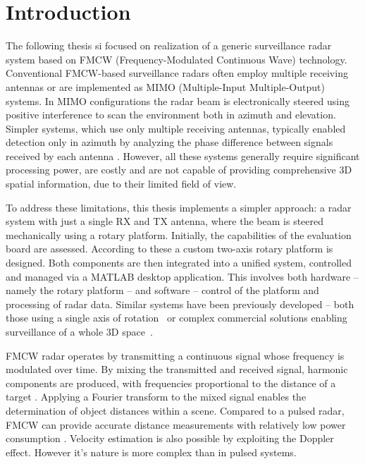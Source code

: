 
\chapter*{Introduction}

The following thesis si focused on realization of a generic surveillance radar system based on FMCW (Frequency-Modulated Continuous Wave) technology.
Conventional FMCW-based surveillance radars often employ multiple receiving antennas or are implemented as MIMO (Multiple-Input Multiple-Output) systems.
In MIMO configurations the radar beam is electronically steered using positive interference to scan the environment both in azimuth and elevation.
Simpler systems, which use only multiple receiving antennas, typically enabled detection only in azimuth by analyzing the phase difference between signals received by each antenna \cite{sandeep2018}.
However, all these systems generally require significant processing power, are costly and are not capable of providing comprehensive 3D spatial information, due to their limited field of view.

To address these limitations, this thesis implements a simpler approach: a radar system with just a single RX and TX antenna, where the beam is steered mechanically using a rotary platform.
Initially, the capabilities of the \sirad evaluation board are assessed.
According to these a custom two-axis rotary platform is designed.
Both components are then integrated into a unified system, controlled and managed via a MATLAB desktop application.
This involves both hardware -- namely the rotary platform -- and software -- control of the platform and processing of radar data.
Similar systems have been previously developed -- both those using a single axis of rotation~\cite{nowok2017, vivet2013} or complex commercial solutions enabling surveillance of a whole 3D space~\cite{blighter}.

FMCW radar operates by transmitting a continuous signal whose frequency is modulated over time.
By mixing the transmitted and received signal, harmonic components are produced, with frequencies proportional to the distance of a target \cite{graham2005}.
Applying a Fourier transform to the mixed signal enables the determination of object distances within a scene.
Compared to a pulsed radar, FMCW can provide accurate distance measurements with relatively low power consumption \cite{jankiraman2018}.
Velocity estimation is also possible by exploiting the Doppler effect.
However it's nature is more complex than in pulsed systems.


